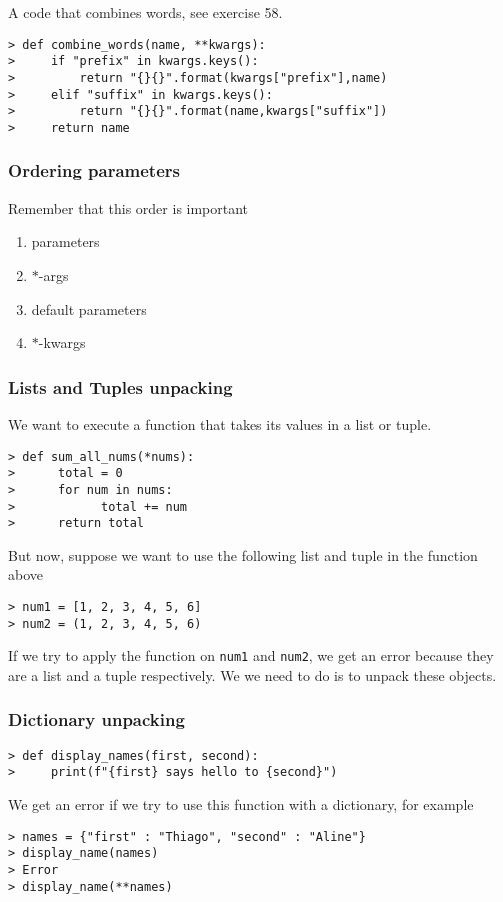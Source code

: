 A code that combines words, see exercise 58.
\begin{verbatim}
> def combine_words(name, **kwargs):
>     if "prefix" in kwargs.keys():
>         return "{}{}".format(kwargs["prefix"],name)
>     elif "suffix" in kwargs.keys():
>         return "{}{}".format(name,kwargs["suffix"])
>     return name
\end{verbatim}

\subsubsection{Ordering parameters} Remember that this order is important
\begin{enumerate}
	\item parameters
	\item \(*\)-args
	\item default parameters	
	\item \(*\)-kwargs
\end{enumerate}

\subsubsection{Lists and Tuples unpacking} We want to execute a function that takes its values in a list or tuple. 
\begin{verbatim}
> def sum_all_nums(*nums):
>      total = 0
>      for num in nums:
>            total += num
>      return total
\end{verbatim}
But now, suppose we want to use the following list and tuple in the function above
\begin{verbatim}
> num1 = [1, 2, 3, 4, 5, 6]
> num2 = (1, 2, 3, 4, 5, 6)
\end{verbatim}
If we try to apply the function on \verb|num1| and \verb|num2|, we get an error because they are a list and a tuple respectively. 
We we need to do is to unpack these objects. 

\subsubsection{Dictionary unpacking} 
\begin{verbatim}
> def display_names(first, second):
>     print(f"{first} says hello to {second}")
\end{verbatim}
We get an error if we try to use this function with a dictionary, for example
\begin{verbatim}
> names = {"first" : "Thiago", "second" : "Aline"}
> display_name(names)
> Error
> display_name(**names)
\end{verbatim}

